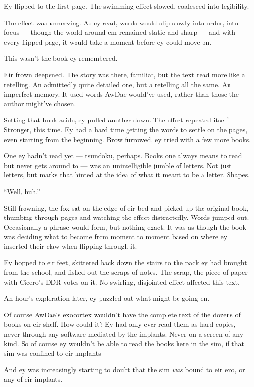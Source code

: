 Ey flipped to the first page. The swimming effect slowed, coalesced into legibility.

The effect was unnerving. As ey read, words would slip slowly into order, into focus — though the world around em remained static and sharp — and with every flipped page, it would take a moment before ey could move on.

This wasn't the book ey remembered.

Eir frown deepened. The story was there, familiar, but the text read more like a retelling. An admittedly quite detailed one, but a retelling all the same. An imperfect memory. It used words AwDae would've used, rather than those the author might've chosen.

Setting that book aside, ey pulled another down. The effect repeated itself. Stronger, this time. Ey had a hard time getting the words to settle on the pages, even starting from the beginning. Brow furrowed, ey tried with a few more books.

One ey hadn't read yet — tsundoku, perhaps. Books one always means to read but never gets around to — was an unintelligible jumble of letters. Not just letters, but marks that hinted at the idea of what it meant to be a letter. Shapes.

``Well, huh.''

Still frowning, the fox sat on the edge of eir bed and picked up the original book, thumbing through pages and watching the effect distractedly. Words jumped out. Occasionally a phrase would form, but nothing exact. It was as though the book was deciding what to become from moment to moment based on where ey inserted their claw when flipping through it.

Ey hopped to eir feet, skittered back down the stairs to the pack ey had brought from the school, and fished out the scraps of notes. The scrap, the piece of paper with Cicero's DDR votes on it. No swirling, disjointed effect affected this text.

An hour's exploration later, ey puzzled out what might be going on.

Of course AwDae's exocortex wouldn't have the complete text of the dozens of books on eir shelf. How could it? Ey had only ever read them as hard copies, never through any software mediated by the implants. Never on a screen of any kind. So of course ey wouldn't be able to read the books here in the sim, if that sim was confined to eir implants.

And ey was increasingly starting to doubt that the sim \emph{was} bound to eir exo, or any of eir implants.


